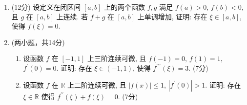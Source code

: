 \begin{enumerate}
    \item (12分) 设定义在闭区间 $[ a , b ]$ 上的两个函数 $f , g$ 满足 $f ( a ) > 0$, $f ( b ) < 0$, 且 $g$ 在 $[ a , b ]$ 上连续.  
    若 $f + g$ 在 $[ a , b ]$ 上单调增加, 证明: 存在 $\xi \in [ a , b ]$, 使得 $f ( \xi ) = 0$. 

    \item (两小题，共14分)
        \begin{enumerate}
            \item[(A)] 设函数 $f$ 在 $[ - 1 , 1 ]$ 上三阶连续可微,  且 $f ( - 1 ) = 0$, $f ( 1 ) = 1$, $f ^ \prime ( 0 ) = 0$. 
            证明: 存在 $\xi \in ( - 1 , 1 )$, 使得 $f ^ {\prime \prime \prime} ( \xi ) = 3$. (7分)
            \item[(B)] 设函数 $f$ 在 $\mathbb {R}$ 上二阶连续可微, 且 $| f ( x ) | \leq 1$, $| f ^ \prime ( 0 ) | > 1$. 
            证明: 存在 $\xi \in \mathbb {R}$ 使得 $f ^ {\prime \prime} ( \xi ) + f ( \xi ) = 0$. (7分)
        \end{enumerate}

\end{enumerate}